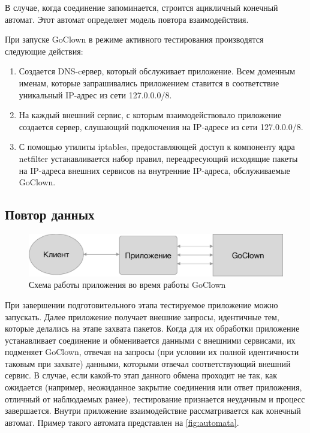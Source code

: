 В случае, когда соединение запоминается, строится ацикличный конечный автомат.
Этот автомат определяет модель повтора взаимодействия.

При запуске GoClown в режиме активного тестирования производятся следующие
действия:
\begin{enumerate}
\item Создается DNS-cервер, который обслуживает приложение. Всем доменным
именам, которые запрашивались приложением ставится в соответствие уникальный
IP-адрес из сети 127.0.0.0/8.  
\item На каждый внешний сервис, с которым взаимодействовало приложение создается
сервер, слушающий подключения на IP-адресе из сети 127.0.0.0/8.  
\item С помощью утилиты iptables, предоставляющей доступ к компоненту ядра
netfilter устанавливается набор правил, переадресующий исходящие пакеты на
IP-адреса внешних сервисов на внутренние IP-адреса, обслуживаемые GoClown.  
\end{enumerate}

\subsection{Повтор данных}

\begin{figure}[H]
\includegraphics[width=\textwidth,height=\textheight,keepaspectratio]
    {img/service_diagram_clowned.eps}
\caption{Схема работы приложения во время работы GoClown}
\label{fig:service_diagram_clowned}
\end{figure}

При завершении подготовительного этапа тестируемое приложение можно запускать.
Далее приложение получает внешние запросы, идентичные тем, которые делались
на этапе захвата пакетов. Когда для их обработки приложение устанавливает
соединение и обменивается данными с внешними сервисами, их подменяет GoClown,
отвечая на запросы (при условии их полной идентичности таковым при захвате)
данными, которыми отвечал соответствующий внешний сервис. В случае, если
какой-то этап данного обмена проходит не так, как ожидается (например,
неожиданное закрытие соединения или ответ приложения, отличный от наблюдаемых
ранее), тестирование признается неудачным и процесс завершается.
Внутри приложение взаимодействие рассматривается как конечный автомат.
Пример такого автомата представлен на \autoref{fig:automata}.

